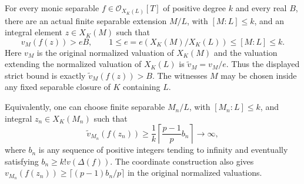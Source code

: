 \begin{lemma}
\label{fw:separable-approximate-roots}
\leanok
For every monic separable $f\in\mathcal O_{X_K(L)}[T]$ of positive
degree $k$ and every real $B$, there are an actual finite separable
extension $M/L$, with $[M:L]\leq k$, and an integral element
$z\in X_K(M)$ such that
\[
 v_M(f(z))>eB,\qquad
 1\leq e=e(X_K(M)/X_K(L))\leq[M:L]\leq k.
\]
Here $v_M$ is the original normalized valuation of $X_K(M)$ and the
valuation extending the normalized valuation of $X_K(L)$ is
$\widetilde v_M=v_M/e$. Thus the displayed strict bound is exactly
$\widetilde v_M(f(z))>B$.
The witnesses $M$ may be chosen inside any fixed separable closure of
$K$ containing $L$.

Equivalently, one can choose finite separable $M_n/L$, with
$[M_n:L]\leq k$, and integral $z_n\in X_K(M_n)$ such that
\[
 \widetilde v_{M_n}(f(z_n))\geq\frac1k
       \left\lceil\frac{p-1}{p}b_n\right\rceil\longrightarrow\infty,
\]
where $b_n$ is any sequence of positive integers tending to infinity
and eventually satisfying $b_n\geq k!v(\Delta(f))$.
The coordinate construction also gives
$v_{M_n}(f(z_n))\geq\lceil(p-1)b_n/p\rceil$ in the original
normalized valuations.
\end{lemma}
